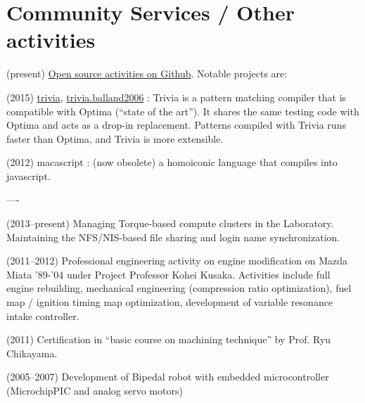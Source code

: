 \documentclass[letterpaper]{article}
\begin{document}
\section{Community Services / Other activities}

(present) \href{https://github.com/guicho271828}{Open source
activities on Github}. Notable projects are:

(2015) \href{https://github.com/guicho271828/trivia}{trivia},
\href{https://github.com/guicho271828/trivia.balland2006}{trivia.balland2006}
: Trivia is a pattern matching compiler that is compatible with
Optima (``state of the art''). It shares the same testing code with Optima and acts as a
drop-in replacement. Patterns compiled with Trivia runs faster than
Optima, and Trivia is more extensible.

(2012) macascript : (now obsolete) a homoiconic language that compiles
into javascript.

----

(2013--present) Managing Torque-based compute clusters in the Laboratory. Maintaining
the NFS/NIS-based file sharing and login name synchronization.

(2011--2012) Professional engineering activity on engine modification on Mazda Miata
'89-'04 under Project Professor Kohei Kusaka. Activities include full
engine rebuilding, mechanical engineering (compression ratio
optimization), fuel map / ignition timing map optimization, development
of variable resonance intake controller.

(2011) Certification in ``basic course on machining technique'' by Prof. Ryu Chikayama.

(2005--2007) Development of Bipedal robot with embedded microcontroller
(Microchip\textregistered PIC and analog servo motors)
\end{document}
